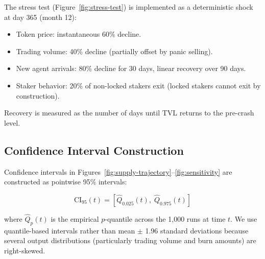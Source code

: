 The stress test (Figure~\ref{fig:stress-test}) is implemented as a
deterministic shock at day 365 (month 12):

\begin{itemize}
  \item Token price: instantaneous 60\% decline.
  \item Trading volume: 40\% decline (partially offset by panic selling).
  \item New agent arrivals: 80\% decline for 30 days, linear recovery over 90
    days.
  \item Staker behavior: 20\% of non-locked stakers exit (locked stakers
    cannot exit by construction).
\end{itemize}

Recovery is measured as the number of days until TVL returns to the pre-crash
level.

\subsection{Confidence Interval Construction}
\label{subsec:sim-ci}

Confidence intervals in Figures~\ref{fig:supply-trajectory}--\ref{fig:sensitivity}
are constructed as pointwise 95\% intervals:

\begin{equation}
  \text{CI}_{95}(t) = \left[\hat{Q}_{0.025}(t),\; \hat{Q}_{0.975}(t)\right]
\end{equation}

where $\hat{Q}_p(t)$ is the empirical $p$-quantile across the 1{,}000 runs at
time $t$. We use quantile-based intervals rather than mean $\pm$ 1.96 standard
deviations because several output distributions (particularly trading volume
and burn amounts) are right-skewed.
